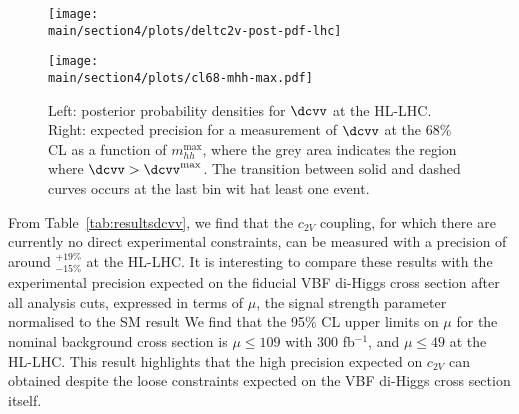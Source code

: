 \begin{figure}[h!]
	\centering
	\begin{minipage}{0.49\textwidth}\centering
		\texttt{[image: \\main/section4/plots/deltc2v-post-pdf-lhc]}
	\end{minipage}
	\begin{minipage}{0.49\textwidth}\centering
		\texttt{[image: \\main/section4/plots/cl68-mhh-max.pdf]}
	\end{minipage}
	\caption{\small Left: posterior probability densities for $\dcvv$ at the HL-LHC.
		Right: expected
		precision for a measurement of $\dcvv$ at the 68\% CL
		as a function of $m_{hh}^{\max}$, where
		the grey area indicates the region where $\dcvv > \dcvv^\text{max}$.
		The transition between solid and dashed curves occurs at the last bin wit hat least one event.
	}
	\label{fig:post-pdf} 
\end{figure}

From Table~\ref{tab:resultsdcvv}, we find that the $c_{2V}$ coupling, for which
there are currently no direct experimental constraints, can be measured 
with a precision of
around  $_{-15\%}^{+19\%}$ at the HL-LHC. 
%
It is interesting to compare these results with the experimental precision
expected on the fiducial VBF di-Higgs cross section after all
analysis cuts, expressed in terms of $\mu$, the signal strength parameter normalised to the SM result 
%
We find that the 95\% CL upper limits on $\mu$ for the nominal background cross section
is $\mu\le 109$ with 300 fb$^{-1}$, and $\mu\le 49$ at the HL-LHC.
%
This result highlights  that the high precision expected on
$c_{2V}$ can obtained despite the loose constraints expected
on the VBF di-Higgs cross section itself.


